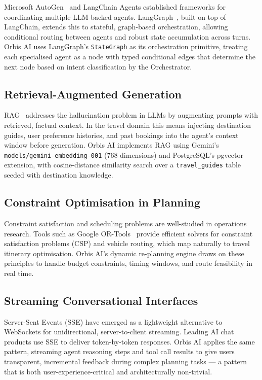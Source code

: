 \documentclass[12pt, a4paper]{article}
\begin{document}
Microsoft AutoGen~\cite{wu2023autogen} and LangChain Agents established frameworks for coordinating multiple LLM-backed agents. LangGraph~\cite{langgraph2024}, built on top of LangChain, extends this to stateful, graph-based orchestration, allowing conditional routing between agents and robust state accumulation across turns. Orbis AI uses LangGraph's \texttt{StateGraph} as its orchestration primitive, treating each specialised agent as a node with typed conditional edges that determine the next node based on intent classification by the Orchestrator.

\subsection{Retrieval-Augmented Generation}

RAG~\cite{lewis2020rag} addresses the hallucination problem in LLMs by augmenting prompts with retrieved, factual context. In the travel domain this means injecting destination guides, user preference histories, and past bookings into the agent's context window before generation. Orbis AI implements RAG using Gemini's \texttt{models/gemini-embedding-001} (768 dimensions) and PostgreSQL's pgvector extension, with cosine-distance similarity search over a \texttt{travel\_guides} table seeded with destination knowledge.

\subsection{Constraint Optimisation in Planning}

Constraint satisfaction and scheduling problems are well-studied in operations research. Tools such as Google OR-Tools~\cite{ortools} provide efficient solvers for constraint satisfaction problems (CSP) and vehicle routing, which map naturally to travel itinerary optimisation. Orbis AI's dynamic re-planning engine draws on these principles to handle budget constraints, timing windows, and route feasibility in real time.

\subsection{Streaming Conversational Interfaces}

Server-Sent Events (SSE) have emerged as a lightweight alternative to WebSockets for unidirectional, server-to-client streaming. Leading AI chat products use SSE to deliver token-by-token responses. Orbis AI applies the same pattern, streaming agent reasoning steps and tool call results to give users transparent, incremental feedback during complex planning tasks --- a pattern that is both user-experience-critical and architecturally non-trivial.
\end{document}
